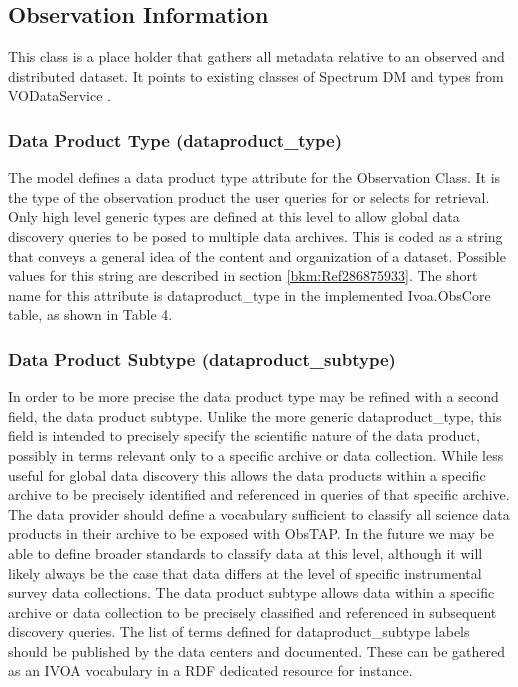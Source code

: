 \documentclass[11pt,a4paper]{ivoa}
\begin{document}
\subsection{Observation Information}
This class is a place holder that gathers all metadata relative to an observed and distributed dataset. It points to
existing classes of Spectrum DM and types from VODataService \citep{2010ivoa.spec.1202P} .

\subsubsection{Data Product Type (dataproduct\_type)}
The model defines a data product type attribute for the Observation Class.  It is the type of the observation product
the user queries for or selects for retrieval.  Only high level generic types are defined at this level to allow global
data discovery queries to be posed to multiple data archives.  This is coded as a string that conveys a general idea of
the content and organization of a dataset.  Possible values for this string are described in section
\ref{bkm:Ref286875933}.  The short name for this attribute is dataproduct\_type in the implemented Ivoa.ObsCore table,
as shown in Table 4.

\subsubsection{Data Product Subtype (dataproduct\_subtype)}
\label{bkm:Ref291536287}In order to be more precise the data product type may be refined with a second field, the data
product subtype.  Unlike the more generic dataproduct\_type, this field is intended to precisely specify the scientific
nature of the data product, possibly in terms relevant only to a specific archive or data collection.  While less
useful for global data discovery this allows the data products within a specific archive to be precisely identified and
referenced in queries of that specific archive.  The data provider should define a vocabulary sufficient to classify
all science data products in their archive to be exposed with ObsTAP.  In the future we may be able to define broader
standards to classify data at this level, although it will likely always be the case that data differs at the level of
specific instrumental survey data collections. The data product subtype allows data within a specific archive or data
collection to be precisely classified and referenced in subsequent discovery queries. The list of terms defined for
dataproduct\_subtype labels should be published by the data centers and documented. These can be gathered as an IVOA
vocabulary in a RDF dedicated resource for instance.
\end{document}
